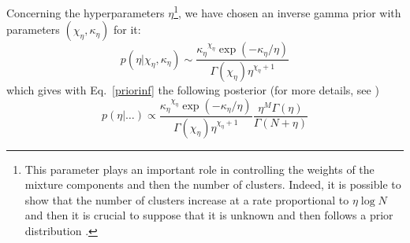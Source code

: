 \documentclass[journal,10pt]{elsart}
\begin{document}
Concerning the hyperparameters $\eta$\footnote{This parameter plays an important role in controlling the weights of the mixture components and then the number of clusters. Indeed, it is possible to show that the number of clusters increase at a rate proportional to $\eta\log N$ and then it is crucial to suppose that it is unknown and then follows a prior distribution \cite{Dunson2009}.}, we have chosen an inverse gamma prior with parameters $(\chi_{\eta},\kappa_{\eta})$ for it:
\begin{equation}\label{concentartion}
p(\eta|\chi_{\eta},\kappa_{\eta}) \sim \frac{{\kappa_{\eta}}^{\chi_{\eta}}\exp(-\kappa_{\eta}/
\eta)}{\Gamma(\chi_{\eta})\eta^{\chi_{\eta}+1}}
\end{equation}
which gives with Eq.~\ref{priorinf} the following posterior (for more details, see \cite{Edward2000})
\begin{equation}\label{posterioreta}
p(\eta|\ldots) \propto \frac{{\kappa_{\eta}}^{\chi_{\eta}}\exp(-\kappa_{\eta}/
\eta)}{\Gamma(\chi_{\eta})\eta^{\chi_{\eta}+1}} \frac{\eta^M \Gamma(\eta)}{\Gamma(N+\eta)}
\end{equation}
\end{document}
